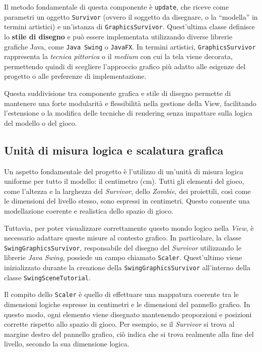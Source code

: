 \documentclass[a4paper,12pt]{report}
\begin{document}
Il metodo fondamentale di questa componente è \texttt{update}, che riceve come parametri un oggetto \texttt{Survivor} (ovvero il soggetto da disegnare, o la “modella” in termini artistici) e un’istanza di \texttt{GraphicsSurvivor}. Quest’ultima classe definisce lo \textbf{stile di disegno} e può essere implementata utilizzando diverse librerie grafiche Java, come \texttt{Java Swing} o \texttt{JavaFX}. In termini artistici, \texttt{GraphicsSurvivor} rappresenta la \emph{tecnica pittorica} o il \emph{medium} con cui la tela viene decorata, permettendo quindi di scegliere l’approccio grafico più adatto alle esigenze del progetto o alle preferenze di implementazione.

Questa suddivisione tra componente grafica e stile di disegno permette di mantenere una forte modularità e flessibilità nella gestione della View, facilitando l’estensione o la modifica delle tecniche di rendering senza impattare sulla logica del modello o del gioco.
\subsection{Unità di misura logica e scalatura grafica}

Un aspetto fondamentale del progetto è l'utilizzo di un'unità di misura logica uniforme per tutto il modello: il centimetro (cm). Tutti gli elementi del gioco, come l'altezza e la larghezza del \textit{Survivor}, dello \textit{Zombie}, dei proiettili, così come le dimensioni del livello stesso, sono espressi in centimetri. Questo consente una modellazione coerente e realistica dello spazio di gioco.

Tuttavia, per poter visualizzare correttamente questo mondo logico nella \textit{View}, è necessario adattare queste misure al contesto grafico. In particolare, la classe \texttt{SwingGraphicsSurvivor}, responsabile del disegno del \textit{Survivor} utilizzando le librerie \textit{Java Swing}, possiede un campo chiamato \texttt{Scaler}. Quest'ultimo viene inizializzato durante la creazione della \texttt{SwingGraphicsSurvivor} all'interno della classe \texttt{SwingSceneTutorial}.

Il compito dello \texttt{Scaler} è quello di effettuare una mappatura coerente tra le dimensioni logiche espresse in centimetri e le dimensioni del pannello grafico. In questo modo, ogni elemento viene disegnato mantenendo proporzioni e posizioni corrette rispetto allo spazio di gioco. Per esempio, se il \textit{Survivor} si trova al margine destro del pannello grafico, ciò indica che si trova realmente alla fine del livello, secondo la sua dimensione logica.
\end{document}
